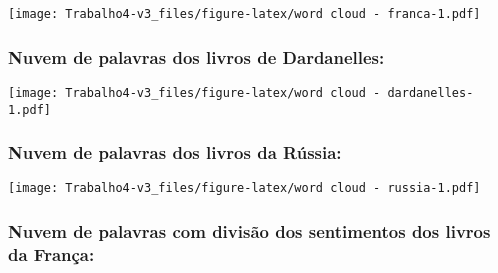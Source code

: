 \documentclass[]{article}
\newenvironment{Shaded}{\begin{snugshade}}{\end{snugshade}}
\newcommand{\DataTypeTok}[1]{\textcolor[rgb]{0.13,0.29,0.53}{#1}}
\newcommand{\DecValTok}[1]{\textcolor[rgb]{0.00,0.00,0.81}{#1}}
\newcommand{\KeywordTok}[1]{\textcolor[rgb]{0.13,0.29,0.53}{\textbf{#1}}}
\newcommand{\NormalTok}[1]{#1}
\newcommand{\OperatorTok}[1]{\textcolor[rgb]{0.81,0.36,0.00}{\textbf{#1}}}
\newcommand{\StringTok}[1]{\textcolor[rgb]{0.31,0.60,0.02}{#1}}
\begin{document}
\texttt{[image: Trabalho4-v3\_files/figure-latex/word cloud - franca-1.pdf]}

\hypertarget{nuvem-de-palavras-dos-livros-de-dardanelles}{%
\subsubsection{Nuvem de palavras dos livros de
Dardanelles:}\label{nuvem-de-palavras-dos-livros-de-dardanelles}}

\begin{Shaded}
\end{Shaded}

\texttt{[image: Trabalho4-v3\_files/figure-latex/word cloud - dardanelles-1.pdf]}

\hypertarget{nuvem-de-palavras-dos-livros-da-russia}{%
\subsubsection{Nuvem de palavras dos livros da
Rússia:}\label{nuvem-de-palavras-dos-livros-da-russia}}

\begin{Shaded}
\end{Shaded}

\texttt{[image: Trabalho4-v3\_files/figure-latex/word cloud - russia-1.pdf]}

\hypertarget{nuvem-de-palavras-com-divisao-dos-sentimentos-dos-livros-da-franca}{%
\subsubsection{Nuvem de palavras com divisão dos sentimentos dos livros
da
França:}\label{nuvem-de-palavras-com-divisao-dos-sentimentos-dos-livros-da-franca}}
\end{document}
